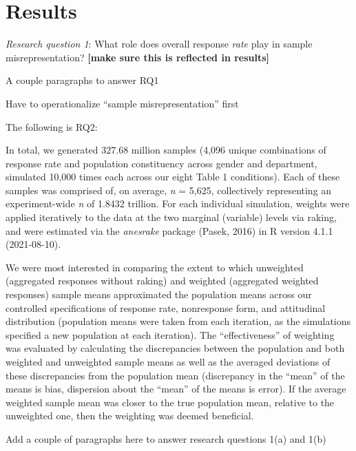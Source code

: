 \documentclass[
  man,mask]{apa7}
\begin{document}
\hypertarget{results}{%
\section{Results}\label{results}}

\emph{Research question 1}: What role does overall response \emph{rate} play in sample misrepresentation? \textbf{{[}make sure this is reflected in results{]}}

A couple paragraphs to answer RQ1

Have to operationalize ``sample misrepresentation'' first

The following is RQ2:

In total, we generated 327.68 million samples (4,096 unique combinations of response rate and population constituency across gender and department, simulated 10,000 times each across our eight Table 1 conditions). Each of these samples was comprised of, on average, \emph{n} = 5,625, collectively representing an experiment-wide \emph{n} of 1.8432 trillion. For each individual simulation, weights were applied iteratively to the data at the two marginal (variable) levels via raking, and were estimated via the \emph{anesrake} package (Pasek, 2016) in R version 4.1.1 (2021-08-10).

We were most interested in comparing the extent to which unweighted (aggregated responses without raking) and weighted (aggregated weighted responses) sample means approximated the population means across our controlled specifications of response rate, nonresponse form, and attitudinal distribution (population means were taken from each iteration, as the simulations specified a new population at each iteration). The ``effectiveness'' of weighting was evaluated by calculating the discrepancies between the population and both weighted and unweighted sample means as well as the averaged deviations of these discrepancies from the population mean (discrepancy in the ``mean'' of the means is bias, dispersion about the ``mean'' of the means is error). If the average weighted sample mean was closer to the true population mean, relative to the unweighted one, then the weighting was deemed beneficial.

Add a couple of paragraphs here to answer research questions 1(a) and 1(b)
\end{document}
